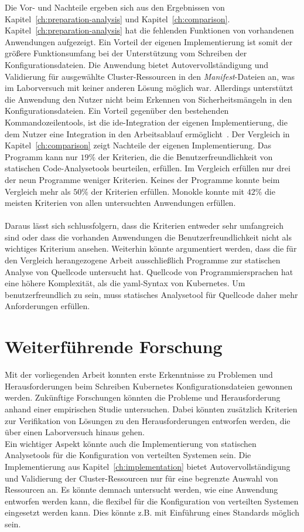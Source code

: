 Die Vor- und Nachteile ergeben sich aus den Ergebnissen von Kapitel~\ref{ch:preparation-analysis} und Kapitel~\ref{ch:comparison}.
Kapitel~\ref{ch:preparation-analysis} hat die fehlenden Funktionen von vorhandenen Anwendungen aufgezeigt. Ein Vorteil der eigenen Implementierung ist
somit der größere Funktionsumfang bei der Unterstützung vom Schreiben der Konfigurationsdateien.
Die Anwendung bietet Autovervollständigung und Validierung für ausgewählte Cluster-Ressourcen in den \textit{Manifest}-Dateien an, was im Laborversuch
mit keiner anderen Lösung möglich war. Allerdings unterstützt die Anwendung den Nutzer nicht beim Erkennen von Sicherheitsmängeln in
den Konfigurationsdateien. Ein Vorteil gegenüber den bestehenden
Kommandozeilentools, ist die \ac{ide}-Integration der eigenen Implementierung, die dem Nutzer eine Integration in den Arbeitsablauf ermöglicht~\cite{usability-criteria-static-analysis-tools}.
Der Vergleich in Kapitel~\ref{ch:comparison} zeigt Nachteile der eigenen Implementierung. Das Programm kann nur $19\%$ der Kriterien, die die
Benutzerfreundlichkeit von statischen Code-Analysetools beurteilen, erfüllen. Im Vergleich erfüllen nur drei der neun Programme weniger Kriterien.
Keines der Programme konnte beim Vergleich mehr als $50\%$ der Kriterien erfüllen.
Monokle konnte mit $42\%$ die meisten Kriterien von allen untersuchten Anwendungen erfüllen.
\\\\
Daraus lässt sich schlussfolgern, dass die Kriterien entweder sehr umfangreich sind oder dass die vorhanden Anwendungen
die Benutzerfreundlichkeit nicht als wichtiges Kriterium ansehen.
Weiterhin könnte argumentiert werden, dass die für den Vergleich herangezogene Arbeit ausschließlich Programme zur statischen Analyse
von Quellcode untersucht hat. Quellcode von Programmiersprachen hat eine höhere Komplexität, als die \ac{yaml}-Syntax von Kubernetes.
Um benutzerfreundlich zu sein, muss statisches Analysetool für Quellcode daher mehr Anforderungen erfüllen.

\section{Weiterführende Forschung}

Mit der vorliegenden Arbeit konnten erste Erkenntnisse zu Problemen und Herausforderungen beim Schreiben Kubernetes
Konfigurationsdateien gewonnen werden. Zukünftige Forschungen könnten die Probleme und Herausforderung
anhand einer empirischen Studie untersuchen. Dabei könnten zusätzlich Kriterien zur Verifikation von Lösungen zu
den Herausforderungen entworfen werden, die über einen Laborversuch hinaus gehen.
\\
Ein wichtiger Aspekt könnte auch die Implementierung von statischen Analysetools für die Konfiguration von
verteilten Systemen sein. Die Implementierung aus Kapitel~\ref{ch:implementation} bietet Autovervollständigung und Validierung
der Cluster-Ressourcen nur für eine begrenzte Auswahl von Ressourcen an. Es könnte demnach untersucht werden,
wie eine Anwendung entworfen werden kann, die flexibel für die Konfiguration von verteilten Systemen eingesetzt werden kann.
Dies könnte z.B. mit Einführung eines Standards möglich sein.